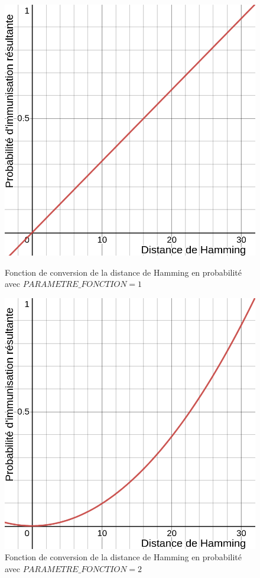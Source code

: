\begin{figure}[h]
  \centering
    \captionsetup{justification=centering}
  \begin{minipage}[b]{0.4\textwidth}
    \includegraphics[width=\textwidth]{Images/fonction_1.png}
    \caption[Fonction de converstion en probabilité (facteur 4)]{Fonction de conversion de la distance de Hamming en probabilité avec $PARAMETRE\_FONCTION = 1$}
  \end{minipage}
  \hfill
  \begin{minipage}[b]{0.4\textwidth}
    \includegraphics[width=\textwidth]{Images/fonction_2.png}
    \caption[Fonction de converstion en probabilité (facteur 4)]{Fonction de conversion de la distance de Hamming en probabilité avec $PARAMETRE\_FONCTION = 2$}
  \end{minipage}
\end{figure}

